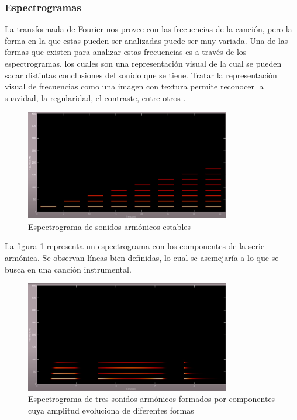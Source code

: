 \documentclass[12pt, letterpaper]{article}
\begin{document}
\subsubsection{Espectrogramas}

La transformada de Fourier nos provee con las frecuencias de la canción,
pero la forma en la que estas pueden ser analizadas puede ser muy variada.
Una de las formas que existen para analizar estas frecuencias es a través de los
espectrogramas, los cuales son una representación visual de la cual se pueden
sacar distintas conclusiones del sonido que se tiene. Tratar la representación
visual de frecuencias como una imagen con textura permite reconocer la suavidad,
la regularidad, el contraste, entre otros \cite{Costa-2011}.

\begin{figure}[H]
  \centering
  \includegraphics[width=0.8\textwidth]{imgs/investigacion/espectrogramas_01.png}
  \caption{Espectrograma de sonidos armónicos estables \cite{Colomer-01}}
  \label{fig:e1}
\end{figure}

\noindent La figura \ref{fig:e1} representa un espectrograma con
los componentes de la serie armónica. Se observan líneas bien definidas,
lo cual se asemejaría a lo que se busca en una canción instrumental.

\begin{figure}[H]
  \centering
  \includegraphics[width=0.8\textwidth]{imgs/investigacion/espectrogramas_02.png}
  \caption{Espectrograma de tres sonidos armónicos formados por
  componentes cuya amplitud evoluciona de diferentes formas \cite{Colomer-02}}
  \label{fig:e2}
\end{figure}
\end{document}
